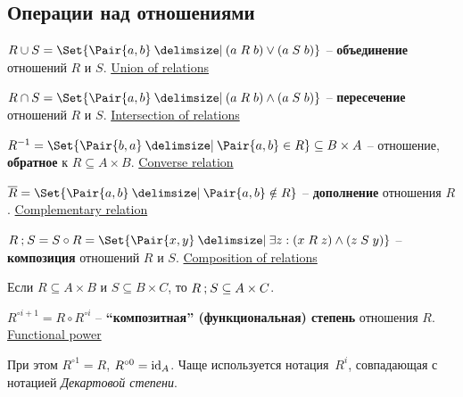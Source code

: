 \documentclass[a4paper,10pt]{article}
\begin{document}
\subsection{Операции над отношениями}

\begin{terms}
    \item $R \union S = \Set{\Pair{a,b} \given (a \rel[R] b) \lor (a \rel[S] b)}$ \--- \textbf{объединение} отношений $R$ и $S$.
    \hfill\href{https://en.wikipedia.org/wiki/Binary_relation#Union}{Union of relations}

    \item $R \intersection S = \Set{\Pair{a,b} \given (a \rel[R] b) \land (a \rel[S] b)}$ \--- \textbf{пересечение} отношений $R$ и $S$.
    \hfill\href{https://en.wikipedia.org/wiki/Binary_relation#Intersection}{Intersection of relations}

    \item $R^{-1} = \Set{\Pair{b,a} \given \Pair{a,b} \in R} \subseteq B \times A$ \--- отношение, \textbf{обратное} к $R \subseteq A \times B$.
    \hfill\href{https://en.wikipedia.org/wiki/Converse_relation}{Converse relation}

    \item $\overline{R} = \Set{\Pair{a,b} \given \Pair{a,b} \notin R}$ \--- \textbf{дополнение} отношения $R$.
    \hfill\href{https://en.wikipedia.org/wiki/Complement_(set_theory)\#Complementary_relation}{Complementary relation}

    \item $R \relcomp S = S \circ R = \Set{\Pair{x,y} \given \exists z : (x \rel[R] z) \land (z \rel[S] y)}$ \--- \textbf{композиция} отношений $R$ и $S$.
    \hfill\href{https://en.wikipedia.org/wiki/Composition_of_relations}{Composition of relations}
    \begin{terms}
        \item Если $R \subseteq A \times B$ и $S \subseteq B \times C$, то $R \mathbin{;} S \subseteq A \times C$.
    \end{terms}

    \item $R^{\circ i+1} = R \circ R^{\circ i}$ \--- \textbf{\enquote{композитная} (функциональная) степень} отношения $R$.
    \hfill\href{https://en.wikipedia.org/wiki/Function_composition#Functional_powers}{Functional power}

    При этом $R^{\circ 1} = R$, $R^{\circ 0} = \mathrm{id}_{A}$.
    Чаще используется нотация~$R^{i}$, совпадающая с нотацией \textit{Декартовой степени}.


\end{terms}
\end{document}
